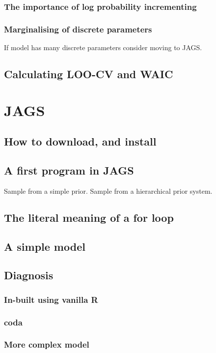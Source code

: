 \documentclass[11pt,fullpage]{book}
\begin{document}
\subsubsection{The importance of log probability incrementing}
\subsubsection{Marginalising of discrete parameters}
If model has many discrete parameters consider moving to JAGS.

\subsection{Calculating LOO-CV and WAIC}

\section{JAGS}
\subsection{How to download, and install}
\subsection{A first program in JAGS}
Sample from a simple prior. Sample from a hierarchical prior system.
\subsection{The literal meaning of a for loop}
\subsection{A simple model}
\subsection{Diagnosis}
\subsubsection{In-built using vanilla R}
\subsubsection{coda}
\subsubsection{More complex model}
\end{document}
